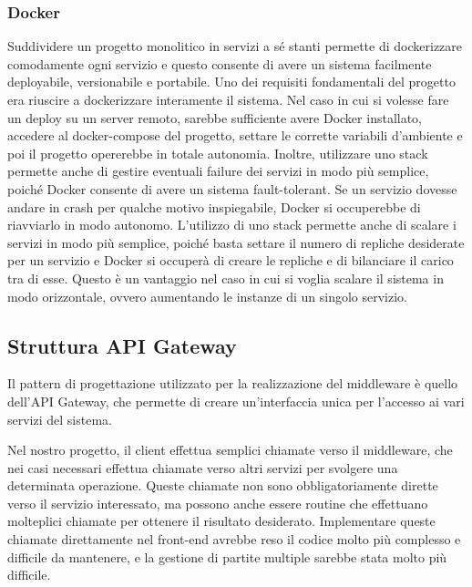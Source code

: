 \subsubsection{Docker}

Suddividere un progetto monolitico in servizi a sé stanti permette di dockerizzare comodamente ogni servizio e questo consente di avere un sistema facilmente deployabile, versionabile e portabile.
Uno dei requisiti fondamentali del progetto era riuscire a dockerizzare interamente il sistema. Nel caso in cui si volesse fare un deploy su un server remoto, sarebbe sufficiente avere Docker installato, accedere al docker-compose del progetto, settare le corrette variabili d'ambiente e poi il progetto opererebbe in totale autonomia.
Inoltre, utilizzare uno stack permette anche di gestire eventuali failure dei servizi in modo più semplice, poiché Docker consente di avere un sistema fault-tolerant. Se un servizio dovesse andare in crash per qualche motivo inspiegabile, Docker si occuperebbe di riavviarlo in modo autonomo.
L'utilizzo di uno stack permette anche di scalare i servizi in modo più semplice, poiché basta settare il numero di repliche desiderate per un servizio e Docker si occuperà di creare le repliche e di bilanciare il carico tra di esse. Questo è un vantaggio nel caso in cui si voglia scalare il sistema in modo orizzontale, ovvero aumentando le instanze di un singolo servizio.


\subsection{Struttura API Gateway}

Il pattern di progettazione utilizzato per la realizzazione del middleware è quello dell'API Gateway, che permette di creare un'interfaccia unica per l'accesso ai vari servizi del sistema.

Nel nostro progetto, il client effettua semplici chiamate verso il middleware, che nei casi necessari effettua chiamate verso altri servizi per svolgere una determinata operazione.
Queste chiamate non sono obbligatoriamente dirette verso il servizio interessato, ma possono anche essere routine che effettuano molteplici chiamate per ottenere il risultato desiderato. 
Implementare queste chiamate direttamente nel front-end avrebbe reso il codice molto più complesso e difficile da mantenere, e la gestione di partite multiple sarebbe stata molto più difficile.

\vspace{1cm}

